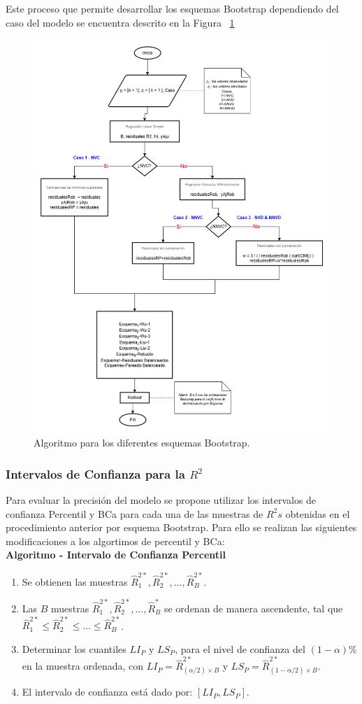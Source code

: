Este proceso que permite desarrollar los esquemas Bootstrap dependiendo del caso del modelo se encuentra descrito en la Figura ~\ref{fig:AlgDifEsqBoots}

 

\begin{figure}
	\centering 
	\includegraphics[width=0.4\linewidth]{img/metodologia_v4.png} 
	\caption{Algoritmo para los diferentes esquemas Bootstrap.}
	\label{fig:AlgDifEsqBoots}
\end{figure}

\subsubsection{Intervalos de Confianza para la $R^{2}$}

Para evaluar la precisión del modelo se propone utilizar los intervalos de confianza Percentil y BCa para cada una de las muestras de $R^{2}s$ obtenidas en el procedimiento anterior por esquema Bootstrap. Para ello se realizan las siguientes modificaciones a los algortimos de percentil y BCa: \\


\textbf{Algoritmo - Intervalo de Confianza Percentil}

\begin{enumerate}
	
	\item Se obtienen las muestras $\hat{R}^{2*}_{1} , \hat{R}^{2*}_{2}, \dots,\hat{R}^{2*}_{B}$.
	
	\item Las $B$ muestras $\hat{R}^{2*}_{1} , \hat{R}^{2*}_{2}, \dots,\hat{R}^{*}_{B}$ se ordenan de manera ascendente, tal que $\hat{R}^{2*}_{1} \leq \hat{R}^{2*}_{2} \leq \dots \leq \hat{R}^{2*}_{B} $.
	
	\item Determinar los cuantiles \( LI_{P} \) y \( LS_{P} \), para el nivel de confianza del \( (1-\alpha)\% \) en la muestra ordenada, con \( LI_{P} = \hat{R}^{2*}_{ ( \alpha/2 ) \times B} \) y \( LS_{P} = \hat{R}^{2*}_{ (1 - \alpha/2) \times B} \).
	
	\item El intervalo de confianza está dado por: \( [LI_{P}, LS_{P}] \).
\end{enumerate}


